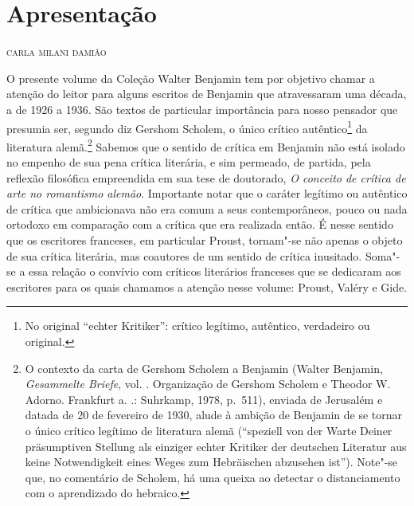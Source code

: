 \chapter*{Apresentação}

\begin{flushright}
{\bigskip\small\scshape\hfill {carla milani damião}}\smallskip
\end{flushright}

\noindent{}O presente volume da Coleção Walter Benjamin tem por objetivo chamar a
atenção do leitor para alguns escritos de Benjamin que atravessaram uma década, a de 1926 a 1936. São textos de particular importância para nosso pensador que
presumia ser, segundo diz Gershom Scholem, o único crítico autêntico\footnote{No original ``echter Kritiker'': crítico legítimo, autêntico, verdadeiro ou original.} da
literatura alemã.\footnote{O contexto da carta de Gershom Scholem a
  Benjamin (Walter Benjamin, \emph{Gesammelte Briefe}, vol. . Organização de Gershom
  Scholem e Theodor W. Adorno. Frankfurt a. .: Suhrkamp, 1978, p.~511), enviada de Jerusalém e datada de 20 de fevereiro de 1930, alude à ambição de
  Benjamin de se tornar o único crítico legítimo de literatura alemã
  (``speziell von der Warte Deiner präsumptiven Stellung als einziger
      echter Kritiker der deutschen Literatur aus keine Notwendigkeit eines
      Weges zum Hebräischen abzusehen ist''). Note"-se que, no comentário de
  Scholem, há uma queixa ao detectar o distanciamento com o aprendizado
  do hebraico.} Sabemos que o sentido de crítica em Benjamin não está
isolado no empenho de sua pena crítica literária, e sim permeado, de
partida, pela reflexão filosófica empreendida em sua tese de doutorado,
\emph{O conceito de crítica de arte no romantismo alemão}. Importante
notar que o caráter legítimo ou autêntico de crítica que ambicionava não era comum a
seus contemporâneos, pouco ou nada ortodoxo em comparação com a crítica que
era realizada então. É nesse sentido que os escritores franceses, em particular Proust, tornam"-se não apenas o objeto de sua crítica literária, mas coautores de um sentido de crítica inusitado. Soma"-se a essa relação o convívio com críticos literários franceses que se dedicaram aos escritores para os quais chamamos a atenção nesse volume: Proust, Valéry e Gide.

